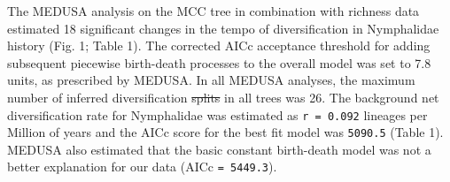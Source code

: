 \documentclass[10pt,letterpaper]{article} %
\providecommand{\DIFadd}[1]{{\protect\color{blue}\uwave{#1}}} %
\providecommand{\DIFdel}[1]{{\protect\color{red}\sout{#1}}}                      %
\providecommand{\DIFaddbegin}{} %
\providecommand{\DIFaddend}{} %
\providecommand{\DIFdelbegin}{} %
\providecommand{\DIFdelend}{} %
\begin{document}
The MEDUSA analysis on the MCC tree in combination with richness data
estimated 18 significant changes in the tempo of diversification in
Nymphalidae history (Fig. 1; Table 1). The corrected AICc acceptance
threshold for adding subsequent piecewise birth-death processes to the
overall model was set to 7.8 units, as prescribed by MEDUSA. In all
MEDUSA analyses, the maximum number of inferred diversification \DIFdelbegin \DIFdel{splits
}\DIFdelend \DIFaddbegin \DIFadd{shifts
}\DIFaddend in all trees was 26. The background net diversification rate for
Nymphalidae was estimated as \texttt{r = 0.092} lineages per Million of
years and the AICc score for the best fit model was \texttt{5090.5}
(Table 1). MEDUSA also estimated that the basic constant birth-death
model was not a better explanation for our data (AICc
\texttt{= 5449.3}).
\end{document}
